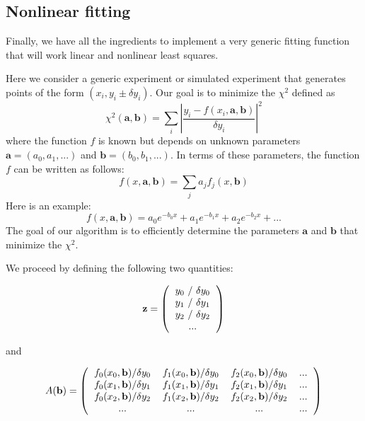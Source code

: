 \documentclass[justified,sixbynine]{tufte-book}
\theoremstyle{plain}%
\theoremstyle{definition}
\theoremstyle{remark}
\begin{document}
\begin{fullwidth}
\goodbreak\section{Nonlinear fitting}

Finally, we have all the ingredients to implement a very generic fitting function that will work linear and nonlinear least squares.

Here we consider a generic experiment or simulated experiment that generates points of the form $(x_i,y_i \pm \delta y_i)$. Our goal is to minimize the $\chi^2$ defined as
\begin{equation}
\chi^2(\mathbf{a},\mathbf{b}) = \sum _i \left|
\frac{y_i - f(x_i,\mathbf{a},\mathbf{b})}{\delta y_i}
\right|^2
\end{equation}
where the function $f$ is known but depends on unknown parameters $\mathbf{a}=(a_0,a_1,...)$ and $\mathbf{b}=(b_0,b_1,...)$. In terms of these parameters, the function $f$ can be written as follows:
\begin{equation}
f(x,\mathbf{a},\mathbf{b}) = \sum_j a_j f_j(x, \mathbf{b})
\end{equation}
Here is an example:
\begin{equation}
f(x,\mathbf{a},\mathbf{b}) = a_0 e^{-b_0 x} + a_1 e^{-b_1 x} + a_2 e^{-b_2 x} + ...
\end{equation}
The goal of our algorithm is to efficiently determine the parameters $\mathbf{a}$ and $\mathbf{b}$ that minimize the $\chi^2$.

We proceed by defining the following two quantities:

\begin{equation}
\mathbf{z} = \left(
\begin{tabular}{c}
$y_0$ / $\delta y_0$ \\
$y_1$ / $\delta y_1$ \\
$y_2$ / $\delta y_2$ \\
...
\end{tabular}
\right)
\end{equation}

and

\begin{equation}
A(\mathbf{b}) = \left(
\begin{tabular}{cccc}
$f_0(x_0,\mathbf{b})/\delta y_0$ &
$f_1(x_0,\mathbf{b})/\delta y_0$ &
$f_2(x_0,\mathbf{b})/\delta y_0$ & ... \\
$f_0(x_1,\mathbf{b})/\delta y_1$ &
$f_1(x_1,\mathbf{b})/\delta y_1$ &
$f_2(x_1,\mathbf{b})/\delta y_1$ & ... \\
$f_0(x_2,\mathbf{b})/\delta y_2$ &
$f_1(x_2,\mathbf{b})/\delta y_2$ &
$f_2(x_2,\mathbf{b})/\delta y_2$ & ... \\
... & ... & ... & ...
\end{tabular}
\right)
\end{equation}


\end{fullwidth}
\end{document}
